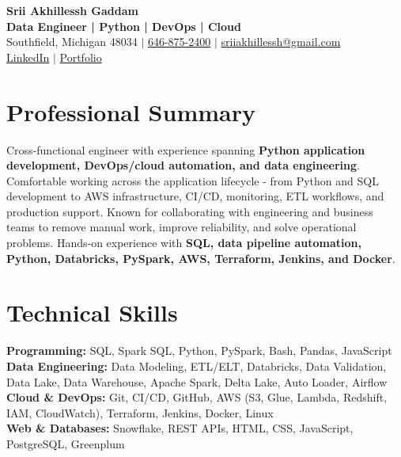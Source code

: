 \documentclass[letterpaper,10pt]{article}
\begin{document}
\fontsize{9.35pt}{10.45pt}\selectfont

\begin{center}
    {\LARGE \textbf{Srii Akhillessh Gaddam}} \\[-1pt]
    \textbf{Data Engineer | Python | DevOps | Cloud} \\[2pt]
    Southfield, Michigan 48034 $|$
    \href{tel:6468752400}{646-875-2400} $|$
    \href{mailto:sriiakhillessh@gmail.com}{sriiakhillessh@gmail.com} \\[1pt]
    \href{https://www.linkedin.com/in/srii-akhiilessh-gaddam-b48668191/}{LinkedIn} $|$
    \href{https://sriiakhillesshg.github.io/portfolio/}{Portfolio}
\end{center}
\vspace{-8pt}

\section{Professional Summary}
\small{Cross-functional engineer with experience spanning \textbf{Python application development, DevOps/cloud automation, and data engineering}. Comfortable working across the application lifecycle - from Python and SQL development to AWS infrastructure, CI/CD, monitoring, ETL workflows, and production support. Known for collaborating with engineering and business teams to remove manual work, improve reliability, and solve operational problems. Hands-on experience with \textbf{SQL, data pipeline automation, Python, Databricks, PySpark, AWS, Terraform, Jenkins, and Docker}.}

\section{Technical Skills}
\small{
\textbf{Programming:} SQL, Spark SQL, Python, PySpark, Bash, Pandas, JavaScript \\
\textbf{Data Engineering:} Data Modeling, ETL/ELT, Databricks, Data Validation, Data Lake, Data Warehouse, Apache Spark, Delta Lake, Auto Loader, Airflow \\
\textbf{Cloud \& DevOps:} Git, CI/CD, GitHub, AWS (S3, Glue, Lambda, Redshift, IAM, CloudWatch), Terraform, Jenkins, Docker, Linux \\
\textbf{Web \& Databases:} Snowflake, REST APIs, HTML, CSS, JavaScript, PostgreSQL, Greenplum
}
\end{document}
